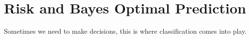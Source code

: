 \section{Risk and Bayes Optimal Prediction}
Sometimes we need to make decisions, this is where classification comes into play. 